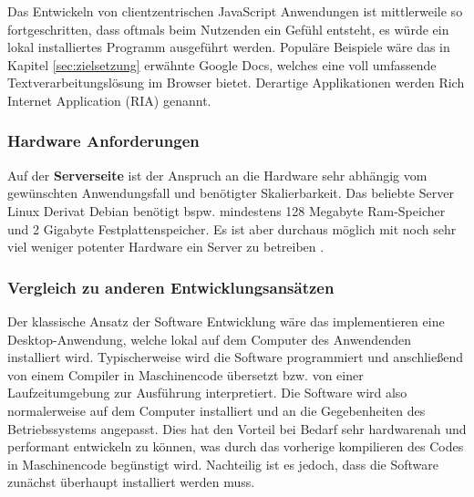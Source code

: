 
 Das Entwickeln von clientzentrischen JavaScript Anwendungen ist mittlerweile so fortgeschritten, dass oftmals beim Nutzenden ein Gefühl entsteht, es würde ein lokal installiertes Programm ausgeführt werden. Populäre Beispiele wäre das in Kapitel \ref{sec:zielsetzung} erwähnte Google Docs, welches eine voll umfassende Textverarbeitungslösung im Browser bietet. Derartige Applikationen werden Rich Internet Application (RIA) genannt.
 

\subsubsection{Hardware Anforderungen}\label{sec:hardware}
Auf der \textbf{Serverseite} ist der Anspruch an die Hardware sehr abhängig vom gewünschten Anwendungsfall und benötigter Skalierbarkeit. Das beliebte Server Linux Derivat Debian benötigt bspw. mindestens 128 Megabyte Ram-Speicher und 2 Gigabyte Festplattenspeicher. Es ist aber durchaus möglich mit noch sehr viel weniger potenter Hardware ein Server zu betreiben \cite{dpakt2019:online}. 
\subsubsection{Vergleich zu anderen Entwicklungsansätzen}\label{sec:vorundnachteileweb}
Der klassische Ansatz der Software Entwicklung wäre das implementieren eine Desktop-Anwendung, welche lokal
auf dem Computer des Anwendenden installiert wird. Typischerweise wird die Software programmiert und anschließend von einem Compiler in Maschinencode übersetzt bzw. von einer Laufzeitumgebung zur Ausführung interpretiert. Die Software wird also normalerweise auf dem Computer installiert und an die Gegebenheiten des Betriebssystems angepasst. Dies hat den Vorteil bei Bedarf sehr hardwarenah und performant entwickeln zu können, was durch das vorherige kompilieren des Codes in Maschinencode begünstigt wird. Nachteilig ist es jedoch, dass die Software zunächst überhaupt installiert werden muss. 

